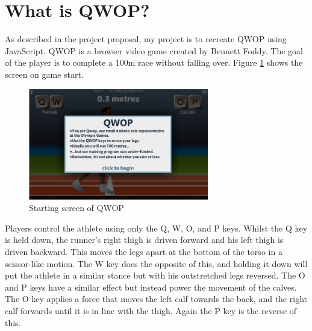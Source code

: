 \documentclass[12pt,a4paper,twoside,openright]{report}
\begin{document}
\section{What is QWOP?}
As described in the project proposal, my project is to recreate QWOP using JavaScript.
QWOP is a browser video game created by Bennett Foddy. The goal of the player is to complete a 100m race without falling over.
Figure \ref{startScreen} shows the screen on game start.
\begin{figure}[htbp]
	\centering
	\includegraphics[width=0.7\textwidth]{startScreen.PNG}
	\caption{Starting screen of QWOP}
	\label{startScreen}
\end{figure}
Players control the athlete using only the Q, W, O, and P keys. 
Whilst the Q key is held down, the runner's right thigh is driven forward and his left thigh is driven backward. This moves the legs apart at the bottom of the torso in a scissor-like motion. 
The W key does the opposite of this, and holding it down will put the athlete in a similar stance but with his outstretched legs reversed.
The O and P keys have a similar effect but instead power the movement of the calves. The O key applies a force that moves the left calf towards the back, and the right calf forwards until it is in line with the thigh. Again the P key is the reverse of this.
\end{document}

